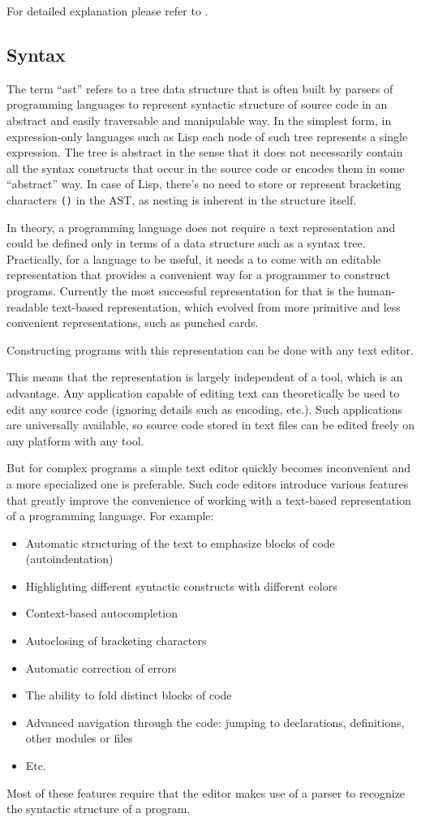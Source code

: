 For detailed explanation please refer to \cite{sicp_meta}.

\subsection{Syntax}
The term ``\acrlong{ast}'' refers to a tree data structure that is often built by parsers of programming languages to represent syntactic structure of source code in an abstract and easily traversable and manipulable way. In the simplest form, in expression-only languages such as Lisp each node of such tree represents a single expression. The tree is abstract in the sense that it does not necessarily contain all the syntax constructs that occur in the source code or encodes them in some ``abstract'' way. In case of Lisp, there's no need to store or represent bracketing characters \texttt{()} in the AST, as nesting is inherent in the structure itself.

In theory, a programming language does not require a text representation and could be defined only in terms of a data structure such as a syntax tree. Practically, for a language to be useful, it needs a to come with an editable representation that provides a convenient way for a programmer to construct programs. Currently the most successful representation for that is the human-readable text-based representation, which evolved from more primitive and less convenient representations, such as punched cards.

Constructing programs with this representation can be done with any text editor.

This means that the representation is largely independent of a tool, which is an advantage. Any application capable of editing text can theoretically be used to edit any source code (ignoring details such as encoding, etc.). Such applications are universally available, so source code stored in text files can be edited freely on any platform with any tool.

But for complex programs a simple text editor quickly becomes inconvenient and a more specialized one is preferable. Such code editors introduce various features that greatly improve the convenience of working with a text-based representation of a programming language. For example:
\begin{itemize}
	\item Automatic structuring of the text to emphasize blocks of code (autoindentation)
	\item Highlighting different syntactic constructs with different colors
	\item Context-based autocompletion
	\item Autoclosing of bracketing characters
	\item Automatic correction of errors
	\item The ability to fold distinct blocks of code
	\item Advanced navigation through the code: jumping to declarations, definitions, other modules or files
	\item Etc.
\end{itemize}
Most of these features require that the editor makes use of a parser to recognize the syntactic structure of a program.

